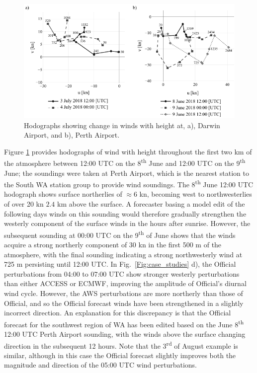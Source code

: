 \documentclass{ametsoc}
\begin{document}
\begin{figure}
\centering
\includegraphics[width=33pc]{perth_sounding.pdf}
\caption{Hodographs showing change in winds with height at, a), Darwin Airport, and b), Perth Airport.}
\label{Fig:perth_sounding}
\end{figure}

Figure \ref{Fig:perth_sounding} provides hodographs of wind with height throughout the first two km of the atmosphere between 12:00 UTC on the 8\textsuperscript{th} June and 12:00 UTC on the 9\textsuperscript{th} June; the soundings were taken at Perth Airport, which is the nearest station to the South WA station group to provide wind soundings. The 8\textsuperscript{th} June 12:00 UTC hodograph shows surface northerlies of $\approx 6$ kn, becoming west to northwesterlies of over 20 kn $2.4$ km above the surface. A forecaster basing a model edit of the following days winds on this sounding would therefore gradually strengthen the westerly component of the surface winds in the hours after sunrise. However, the subsequent sounding at 00:00 UTC on the 9\textsuperscript{th} of June shows that the winds acquire a strong northerly component of 30 kn in the first 500 m of the atmosphere, with the final sounding indicating a strong northwesterly wind at 725 m persisting until 12:00 UTC. In Fig.~\ref{Fig:case_studies} d), the Official perturbations from 04:00 to 07:00 UTC show stronger westerly perturbations than either ACCESS or ECMWF, improving the amplitude of Official's diurnal wind cycle. However, the AWS perturbations are more northerly than those of Official, and so the Official forecast winds have been strengthened in a slightly incorrect direction. An explanation for this discrepancy is that the Official forecast for the southwest region of WA has been edited based on the June 8\textsuperscript{th} 12:00 UTC Perth Airport sounding, with the winds above the surface changing direction in the subsequent 12 hours. Note that the 3\textsuperscript{rd} of August example is similar, although in this case the Official forecast slightly improves both the magnitude and direction of the 05:00 UTC wind perturbations.
\end{document}
